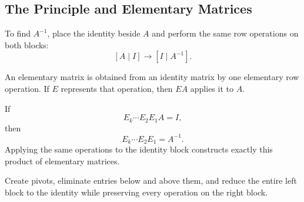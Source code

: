 \subsection{The Principle and Elementary Matrices}

To find $A^{-1}$, place the identity beside $A$ and perform the same row operations on both blocks:
\[
[A\mid I]\longrightarrow[I\mid A^{-1}].
\]

\begin{definitionbox}
An elementary matrix is obtained from an identity matrix by one elementary row operation. If $E$ represents that operation, then $EA$ applies it to $A$.
\end{definitionbox}

\begin{proofbox}
If
\[
E_k\cdots E_2E_1A=I,
\]
then
\[
E_k\cdots E_2E_1=A^{-1}.
\]
Applying the same operations to the identity block constructs exactly this product of elementary matrices.
\end{proofbox}

\begin{corebox}
Create pivots, eliminate entries below and above them, and reduce the entire left block to the identity while preserving every operation on the right block.
\end{corebox}
